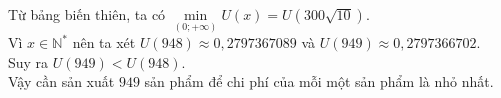 \begin{bt}
{\begin{enumerate}
\begin{center}
			\end{center}
			Từ bảng biến thiên, ta có $\min\limits_{(0;+\infty)} U(x)=U\left(300\sqrt{10}\right)$. \\
			Vì $x\in\mathbb{N}^{\ast}$ nên ta xét $U(948)\approx0{,}2797367089$ và $U(949)\approx0{,}2797366702$. \\
			Suy ra $U(949)<U(948)$. \\
			Vậy cần sản xuất $949$ sản phẩm để chi phí của mỗi một sản phẩm là nhỏ nhất.
		\end{enumerate}
	}
\end{bt}

\begin{bt}%


\end{bt}

